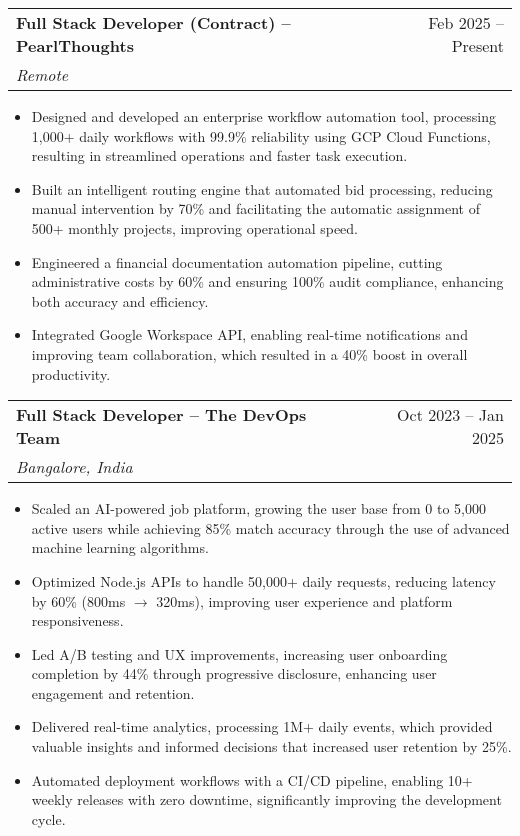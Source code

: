 \documentclass[letterpaper,11pt]{article}
\makeatletter
\newcommand{\resumeItem}[1]{
  \item\small{
    {#1 \vspace{-2pt}}
  }
}
\newcommand{\resumeSubheading}[4]{
  \vspace{-2pt}\item
    \begin{tabular*}{0.97\textwidth}[t]{l@{\extracolsep{\fill}}r}
      \textbf{#1} & #2 \\
      \textit{\small#3} & \textit{\small #4} \\
    \end{tabular*}\vspace{-7pt}
}
\newcommand{\resumeSubHeadingListEnd}{\end{itemize}}
\newcommand{\resumeItemListStart}{\begin{itemize}}
\newcommand{\resumeItemListEnd}{\end{itemize}\vspace{-5pt}}
\makeatother
\begin{document}
    
  \resumeSubheading
    {Full Stack Developer (Contract) -- PearlThoughts}{Feb 2025 -- Present}
    {Remote}{}
    \resumeItemListStart
      \resumeItem{Designed and developed an enterprise workflow automation tool, processing 1,000+ daily workflows with 99.9\% reliability using GCP Cloud Functions, resulting in streamlined operations and faster task execution.}
      \resumeItem{Built an intelligent routing engine that automated bid processing, reducing manual intervention by 70\% and facilitating the automatic assignment of 500+ monthly projects, improving operational speed.}
      \resumeItem{Engineered a financial documentation automation pipeline, cutting administrative costs by 60\% and ensuring 100\% audit compliance, enhancing both accuracy and efficiency.}
      \resumeItem{Integrated Google Workspace API, enabling real-time notifications and improving team collaboration, which resulted in a 40\% boost in overall productivity.}
    \resumeItemListEnd

  \resumeSubheading
    {Full Stack Developer -- The DevOps Team}{Oct 2023 -- Jan 2025}
    {Bangalore, India}{}
    \resumeItemListStart
   \resumeItem{Scaled an AI-powered job platform, growing the user base from 0 to 5,000 active users while achieving 85\% match accuracy through the use of advanced machine learning algorithms.}
      \resumeItem{Optimized Node.js APIs to handle 50,000+ daily requests, reducing latency by 60\% (800ms $\rightarrow$ 320ms), improving user experience and platform responsiveness.}
      \resumeItem{Led A/B testing and UX improvements, increasing user onboarding completion by 44\% through progressive disclosure, enhancing user engagement and retention.}
      \resumeItem{Delivered real-time analytics, processing 1M+ daily events, which provided valuable insights and informed decisions that increased user retention by 25\%.}
      \resumeItem{Automated deployment workflows with a CI/CD pipeline, enabling 10+ weekly releases with zero downtime, significantly improving the development cycle.}
   
  \resumeSubHeadingListEnd


\end{document}
